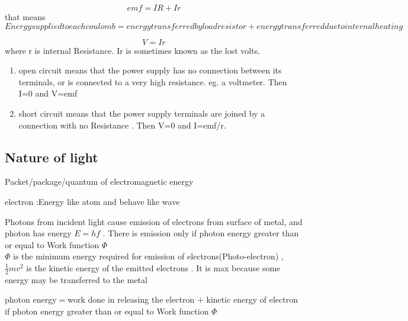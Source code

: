 \documentclass[a4paper]{article}
\begin{document}
\begin{defi}
\begin{equation*}
    emf=IR+Ir
\end{equation*}
that means
\begin{equation*}
    Energy supplied to each coulomb =energy transferred by load resistor+energy transferred due to internal heating
\end{equation*}
\end{defi}
\begin{defi}
\begin{equation*}
    V=Ir
\end{equation*}
where r is internal Resistance. Ir is sometimes known as the lost volts.
\begin{enumerate}
    \item open circuit means that the power supply has no connection between its terminals, or is connected to a very high resistance. eg. a voltmeter. Then I=0 and V=emf
    \item short circuit means that the power supply terminals are joined by a connection with no Resistance . Then V=0 and I=emf/r.
\end{enumerate}
\end{defi}
\subsection{Nature of light}
\begin{defi}

\end{defi}

\begin{defi}[Photon]
Packet/package/quantum of electromagnetic energy

electron :Energy like atom and behave like wave
\end{defi}

\begin{defi}
Photons from incident light cause emission of electrons from surface of metal, and photon has energy $E=hf$ . There is emission only if photon energy greater than or equal to Work function $\Phi$\\

$\Phi$ is the minimum energy required for emission of electrons(Photo-electron) , $\frac{1}{2}mv^2$ is the kinetic energy of the emitted electrons . It is max because some energy may be transferred to the metal

photon energy$=$work done in releasing the electron $+$ kinetic energy of electron\\
if photon energy greater than or equal to Work function $\Phi$\\
\end{defi}
\end{document}
